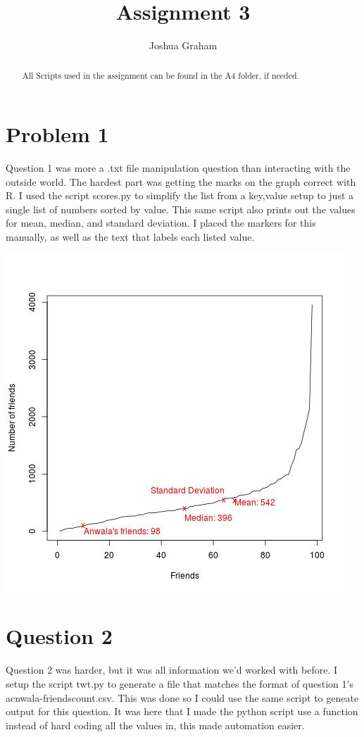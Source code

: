 \documentclass[11pt]{report}
\begin{document}
\title{Assignment 3}
\author{Joshua Graham}

\maketitle
\pagebreak
\begin{abstract}
All Scripts used in the assignment can be found in the A4 folder, if needed.

\end{abstract}
\section{Problem 1}
	Question 1 was more a .txt file manipulation question than interacting with the outside world. The hardest part was getting the marks on the graph correct with R. I used the script scores.py to simplify the list from a key,value setup to just a single list of numbers sorted by value. This same script also prints out the values for mean, median, and standard deviation. I placed the markers for this manually, as well as the text that labels each listed value.
	
\includegraphics[scale=1]{A1.jpeg}
\pagebreak
\section{Question 2}
	Question 2 was harder, but it was all information we'd worked with before. I setup the script twt.py to generate a file that matches the format of question 1's acnwala-friendscount.csv. This was done so I could use the same script to geneate output for this question. It was here that I made the python script use a function instead of hard coding all the values in, this made automation easier. 
	
\end{document}
